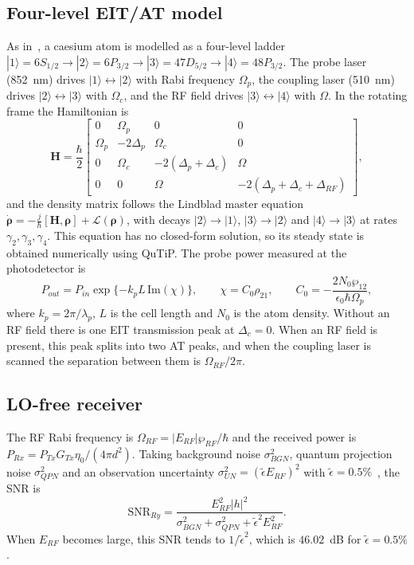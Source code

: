\documentclass[11pt,a4paper]{article}
\begin{document}
\subsection{Four-level EIT/AT model}

As in~\cite{chen2025harnessing}, a caesium atom is modelled as a four-level ladder
$|1\rangle\!=\!6S_{1/2}\rightarrow|2\rangle\!=\!6P_{3/2}\rightarrow|3\rangle\!=\!47D_{5/2}\rightarrow|4\rangle\!=\!48P_{3/2}$.
The probe laser (852~nm) drives $|1\rangle\!\leftrightarrow\!|2\rangle$ with Rabi frequency
$\Omega_p$, the coupling laser (510~nm) drives $|2\rangle\!\leftrightarrow\!|3\rangle$ with
$\Omega_c$, and the RF field drives $|3\rangle\!\leftrightarrow\!|4\rangle$ with $\Omega$.
In the rotating frame the Hamiltonian is
\begin{equation}
\mathbf H=\frac{\hbar}{2}
\begin{bmatrix}
0 & \Omega_p & 0 & 0\\
\Omega_p & -2\Delta_p & \Omega_c & 0\\
0 & \Omega_c & -2(\Delta_p+\Delta_c) & \Omega\\
0 & 0 & \Omega & -2(\Delta_p+\Delta_c+\Delta_{RF})
\end{bmatrix},
\label{eq:H}
\end{equation}
and the density matrix follows the Lindblad master equation
$\dot{\boldsymbol\rho}=-\frac{j}{\hbar}[\mathbf H,\boldsymbol\rho]+\mathcal L(\boldsymbol\rho)$,
with decays $|2\rangle\!\to\!|1\rangle$, $|3\rangle\!\to\!|2\rangle$ and
$|4\rangle\!\to\!|3\rangle$ at rates $\gamma_2,\gamma_3,\gamma_4$. This equation has no
closed-form solution, so its steady state is obtained numerically using QuTiP. The probe
power measured at the photodetector is
\begin{equation}
P_{out}=P_{in}\exp\{-k_pL\,\mathrm{Im}(\chi)\},\qquad
\chi=C_0\rho_{21},\qquad C_0=-\frac{2N_0\wp_{12}}{\epsilon_0\hbar\Omega_p},
\label{eq:pout}
\end{equation}
where $k_p=2\pi/\lambda_p$, $L$ is the cell length and $N_0$ is the atom density. Without an
RF field there is one EIT transmission peak at $\Delta_c=0$. When an RF field is present, this
peak splits into two AT peaks, and when the coupling laser is scanned the separation between
them is $\Omega_{RF}/2\pi$.

\subsection{LO-free receiver}

The RF Rabi frequency is $\Omega_{RF}=|E_{RF}|\wp_{RF}/\hbar$ and the received power is
$P_{Rx}=P_{Tx}G_{Tx}\eta_0/(4\pi d^2)$. Taking background noise $\sigma^2_{BGN}$, quantum
projection noise $\sigma^2_{QPN}$ and an observation uncertainty
$\sigma^2_{UN}=(\tilde\epsilon E_{RF})^2$ with $\tilde\epsilon=0.5\%$~\cite{sedlacek2012}, the
SNR is
\begin{equation}
\mathrm{SNR}_{Ry}=\frac{E_{RF}^2|h|^2}{\sigma^2_{BGN}+\sigma^2_{QPN}+\tilde\epsilon^2E_{RF}^2}.
\label{eq:snr_lofree}
\end{equation}
When $E_{RF}$ becomes large, this SNR tends to $1/\tilde\epsilon^2$, which is $46.02$~dB for
$\tilde\epsilon=0.5\%$.
\end{document}

